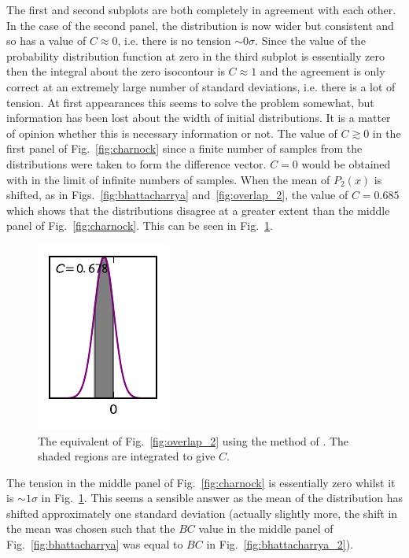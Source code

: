 \documentclass[twocolumn]{revtex4-1}
\begin{document}
    \noindent The first and second subplots are both completely in agreement with each other.
    In the case of the second panel, the distribution is now wider but consistent and so has a value of $C \approx 0$, i.e. there is no tension $\sim0\sigma$.
    Since the value of the probability distribution function at zero in the third subplot is essentially zero then the integral about the zero isocontour is $C\approx1$ and the agreement is only correct at an extremely large number of standard deviations, i.e. there is a lot of tension.
    At first appearances this seems to solve the problem somewhat, but information has been lost about the width of initial distributions.
    It is a matter of opinion whether this is necessary information or not.
    The value of $C\gtrsim0$ in the first panel of Fig.~\ref{fig:charnock} since a finite number of samples from the distributions were taken to form the difference vector.
    $C=0$ would be obtained with in the limit of infinite numbers of samples.
    When the mean of $P_2(x)$ is shifted, as in Figs.~\ref{fig:bhattacharrya} and~\ref{fig:overlap_2}, the value of $C=0.685$ which shows that the distributions disagree at a greater extent than the middle panel of Fig.~\ref{fig:charnock}.
    This can be seen in Fig.~\ref{fig:charnock_2}.
        \begin{figure}
        \centering
        \includegraphics{../comparison/plots/Charnock_2.pdf}
        \caption{The equivalent of Fig.~\ref{fig:overlap_2} using the method of \cite{Battye:2014qga}. The shaded regions are integrated to give $C$.}
        \label{fig:charnock_2}
    \end{figure}
    \noindent The tension in the middle panel of Fig.~\ref{fig:charnock} is essentially zero whilst it is $\sim1\sigma$ in Fig.~\ref{fig:charnock_2}.
    This seems a sensible answer as the mean of the distribution has shifted approximately one standard deviation (actually slightly more, the shift in the mean was chosen such that the $BC$ value in the middle panel of Fig.~\ref{fig:bhattacharrya} was equal to $BC$ in Fig.~\ref{fig:bhattacharrya_2}).
\end{document}
